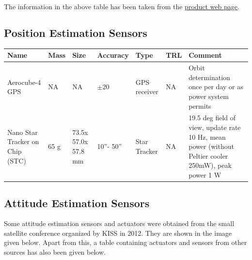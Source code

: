 
The information in the above table has been taken from the \href{http://www.analog.com/static/imported-files/selection_tables/MEMS_Inertial_Sensors_Selection_Tables.pdf}{product web page}.

\subsection{Position Estimation Sensors}
\begin{center}

     \begin{tabular}{ |p{2cm} | p{1cm} | p{2cm} | l | l | l | p{5cm} |}
     \hline

      {\bf Name} & {\bf Mass} & {\bf Size} & {\bf Accuracy} & {\bf Type} & {\bf TRL} & {\bf Comment}  \\ \hline

     Aerocube-4 GPS \cite{Gangestad} & NA & NA &  {$ \pm 20 $} & GPS receiver & NA & Orbit determination once per day or as power system permits \\ \hline

     Nano Star Tracker on Chip (STC) \cite{Prokhorov} & 65 g & 73.5x 57.0x 57.8 mm & 10''- 50'' & Star Tracker & NA & 19.5 deg field of view, update rate 10 Hz, mean power (without Peltier cooler 250mW), peak power 1 W \\ \hline
     \end{tabular}
\end{center}

\subsection{Attitude Estimation Sensors}
Some attitude estimation sensors and actuators were obtained from the small satellite conference organized by KISS in 2012. They are shown in the image given below.  Apart from this, a table containing actuators and sensors from other sources has also been given below. 

